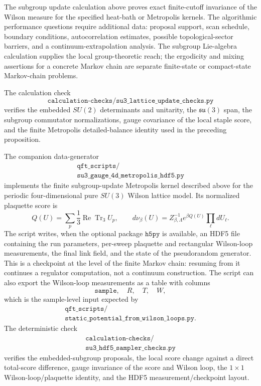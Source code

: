 \begin{remark}
\label{ca:su3-subgroup-algorithm-status}
The subgroup update calculation above proves exact finite-cutoff invariance
of the Wilson measure for the specified heat-bath or Metropolis kernels.  The
algorithmic performance questions require additional data: proposal support,
scan schedule, boundary conditions, autocorrelation estimates, possible
topological-sector barriers, and a continuum-extrapolation analysis.  The
subgroup Lie-algebra calculation supplies the local group-theoretic reach; the
ergodicity and mixing assertions for a concrete Markov chain are separate
finite-state or compact-state Markov-chain problems.
\end{remark}

The calculation check
\[
  \texttt{calculation-checks/su3\_lattice\_update\_checks.py}
\]
verifies the embedded \(SU(2)\) determinants and unitarity, the
\(\mathfrak{su}(3)\) span, the subgroup commutator normalizations, gauge
covariance of the local staple score, and the finite Metropolis
detailed-balance identity used in the preceding proposition.

The companion data-generator
\[
  \begin{gathered}
  \texttt{qft\_scripts/}\\
  \texttt{su3\_gauge\_4d\_metropolis\_hdf5.py}
  \end{gathered}
\]
implements the finite subgroup-update Metropolis kernel described above for
the periodic four-dimensional pure \(SU(3)\) Wilson lattice model.  Its
normalized plaquette score is
\begin{equation}
  Q(U)=\sum_p\frac13\operatorname{Re}\operatorname{Tr}_3 U_p,
  \qquad
  d\nu_\beta(U)=Z_{\beta,\Lambda}^{-1}e^{\beta Q(U)}
  \prod_{\ell}dU_\ell .
  \label{eq:su3-script-wilson-measure}
\end{equation}
The script writes, when the optional package \(\texttt{h5py}\) is available,
an HDF5 file containing the run parameters, per-sweep plaquette and
rectangular Wilson-loop measurements, the final link field, and the state of
the pseudorandom generator.  This is a checkpoint at the level of the finite
Markov chain: resuming from it continues a regulator computation, not a
continuum construction.  The script can also export the Wilson-loop
measurements as a table with columns
\[
  \texttt{sample},\quad R,\quad T,\quad W ,
\]
which is the sample-level input expected by
\[
  \begin{gathered}
  \texttt{qft\_scripts/}\\
  \texttt{static\_potential\_from\_wilson\_loops.py}.
  \end{gathered}
\]
The deterministic check
\[
  \begin{gathered}
  \texttt{calculation-checks/}\\
  \texttt{su3\_hdf5\_sampler\_checks.py}
  \end{gathered}
\]
verifies the embedded-subgroup proposals, the local score change against a
direct total-score difference, gauge invariance of the score and Wilson loop,
the \(1\times1\) Wilson-loop/plaquette identity, and the HDF5
measurement/checkpoint layout.


